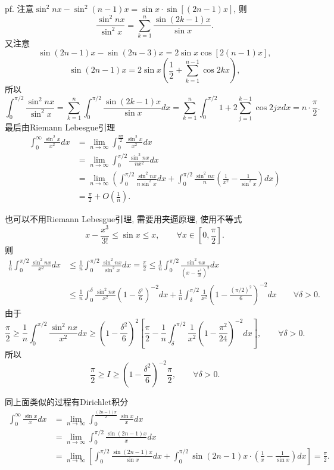 pf. 注意$\sin^{2}nx-\sin^{2}(n-1)x=\sin x\cdot\sin\left[(2n-1)x\right]$,
则
\[
\frac{\sin^{2}nx}{\sin^{2}x}=\sum_{k=1}^{n}\frac{\sin(2k-1)x}{\sin x}.
\]
又注意
\[
\sin(2n-1)x-\sin(2n-3)x=2\sin x\cos\left[2(n-1)x\right],
\]
\[
\sin(2n-1)x=2\sin x\left(\frac{1}{2}+\sum_{k=1}^{n-1}\cos2kx\right),
\]
所以
\[
\int_{0}^{\pi/2}\frac{\sin^{2}nx}{\sin^{2}x}=\sum_{k=1}^{n}\int_{0}^{\pi/2}\frac{\sin(2k-1)x}{\sin x}dx=\sum_{k=1}^{n}\int_{0}^{\pi/2}1+2\sum_{j=1}^{k-1}\cos2jxdx=n\cdot\frac{\pi}{2}.
\]
最后由Riemann Lebesgue引理
\begin{align*}
	\int_{0}^{\infty}\frac{\sin^{2}x}{x^{2}}dx & =\lim_{n\to\infty}\int_{0}^{\frac{n\pi}{2}}\frac{\sin^{2}x}{x^{2}}dx\\
	& =\lim_{n\to\infty}\int_{0}^{\pi/2}\frac{\sin^{2}nx}{nx^{2}}dx\\
	& =\lim_{n\to\infty}\left(\int_{0}^{\pi/2}\frac{\sin^{2}nx}{n\sin^{2}x}dx+\int_{0}^{\pi/2}\frac{\sin^{2}nx}{n}\left(\frac{1}{x^{2}}-\frac{1}{\sin^{2}x}\right)dx\right)\\
	& =\frac{\pi}{2}+O\left(\frac{1}{n}\right).
\end{align*}

也可以不用Riemann Lebesgue引理, 需要用夹逼原理, 使用不等式
\[
x-\frac{x^{3}}{3!}\le\sin x\le x,\qquad\forall x\in\left[0,\frac{\pi}{2}\right].
\]
则
\begin{align*}
	\frac{1}{n}\int_{0}^{\pi/2}\frac{\sin^{2}nx}{x^{2}}dx & \le\frac{1}{n}\int_{0}^{\pi/2}\frac{\sin^{2}nx}{\sin^{2}x}dx=\frac{\pi}{2}\le\frac{1}{n}\int_{0}^{\pi/2}\frac{\sin^{2}nx}{\left(x-\frac{x^{3}}{3!}\right)^{2}}dx\\
	& \le\frac{1}{n}\int_{0}^{\delta}\frac{\sin^{2}nx}{x^{2}}\left(1-\frac{\delta^{2}}{6}\right)^{-2}dx+\frac{1}{n}\int_{\delta}^{\pi/2}\frac{1}{x^{2}}\left(1-\frac{(\pi/2)^{2}}{6}\right)^{-2}dx\qquad\forall\delta>0.
\end{align*}
由于
\[
\frac{\pi}{2}\ge\frac{1}{n}\int_{0}^{\pi/2}\frac{\sin^{2}nx}{x^{2}}dx\ge\left(1-\frac{\delta^{2}}{6}\right)^{2}\left[\frac{\pi}{2}-\frac{1}{n}\int_{\delta}^{\pi/2}\frac{1}{x^{2}}\left(1-\frac{\pi^{2}}{24}\right)^{-2}dx\right],\qquad\forall\delta>0.
\]
所以
\[
\frac{\pi}{2}\ge I\ge\left(1-\frac{\delta^{2}}{6}\right)^{-2}\frac{\pi}{2},\qquad\forall\delta>0.
\]

同上面类似的过程有Dirichlet积分
\begin{align*}
	\int_{0}^{\infty}\frac{\sin x}{x}dx & =\lim_{n\to\infty}\int_{0}^{\frac{(2n-1)\pi}{2}}\frac{\sin x}{x}dx\\
	& =\lim_{n\to\infty}\int_{0}^{\pi/2}\frac{\sin(2n-1)x}{x}dx\\
	& =\lim_{n\to\infty}\left[\int_{0}^{\pi/2}\frac{\sin(2n-1)x}{\sin x}dx+\int_{0}^{\pi/2}\sin(2n-1)x\cdot\left(\frac{1}{x}-\frac{1}{\sin x}\right)dx\right]=\frac{\pi}{2}.
\end{align*}


